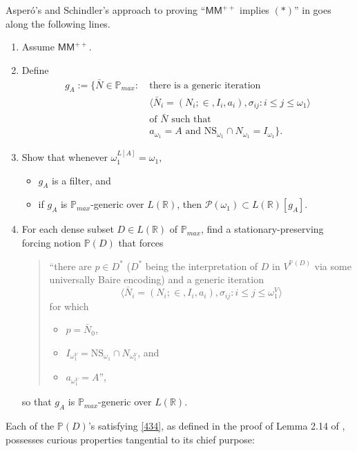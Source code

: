 \documentclass[12pt]{article}
\numberwithin{equation}{section}
\begin{document}
Asper\'{o}'s and Schindler's approach to proving ``$\mathsf{MM}^{++}$ implies $(*)$'' in \cite{schindler} goes along the following lines. 
\begin{enumerate}[label=(\arabic*)]
    \item Assume $\mathsf{MM}^{++}$.
    \item Define 
    \begin{align*}
        g_A := \{\bar{N} \in \mathbb{P}_{max} : \ & \text{there is a generic iteration } \\ 
        & \langle \bar{N}_i = (N_i; \in, I_i, a_i), \sigma_{ij} : i \leq j \leq \omega_1 \rangle \\
        & \text{of } \bar{N} \text{ such that} \\
        & a_{\omega_1} = A \text{ and } \mathrm{NS}_{\omega_1} \cap N_{\omega_1} = I_{\omega_1}\} \text{.}
    \end{align*}
    \item Show that whenever $\omega_1^{L[A]} = \omega_1$,
    \begin{itemize}
        \item $g_A$ is a filter, and
        \item if $g_A$ is $\mathbb{P}_{max}$-generic over $L(\mathbb{R})$, then $\mathcal{P}(\omega_1) \subset L(\mathbb{R})[g_A]$.
    \end{itemize}
    \item\label{434} For each dense subset $D \in L(\mathbb{R})$ of $\mathbb{P}_{max}$, find a stationary-preserving forcing notion $\mathbb{P}(D)$ that forces
    \begin{quote}
        ``there are $p \in D^*$ ($D^*$ being the interpretation of $D$ in $V^{\mathbb{P}(D)}$ via some universally Baire encoding) and a generic iteration $$\langle \bar{N}_i = (N_i; \in, I_i, a_i), \sigma_{ij} : i \leq j \leq \omega_1^V \rangle$$ for which
        \begin{itemize}
            \item $p = \bar{N}_0$,
            \item $I_{\omega_1^V} = \mathrm{NS}_{\omega_1} \cap N_{\omega_1^V}$, and
            \item $a_{\omega_1^V} = A$'',
        \end{itemize}
    \end{quote}
    so that $g_A$ is $\mathbb{P}_{max}$-generic over $L(\mathbb{R})$.
\end{enumerate}
Each of the $\mathbb{P}(D)$'s satisfying \ref{434}, as defined in the proof of Lemma 2.14 of \cite{schindler}, possesses curious properties tangential to its chief purpose:
\end{document}
